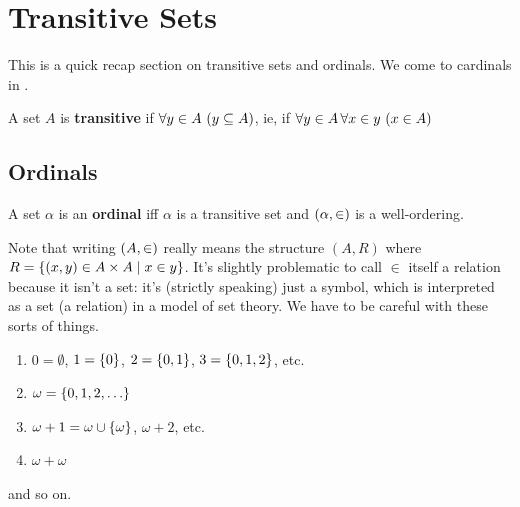 \section{Transitive Sets}

This is a quick recap section on transitive sets and ordinals. We come to cardinals in .

\begin{boxdefinition}[Transitive Set]
    A set $A$ is \textbf{transitive} if $\forall y \in A \, \left( y \subseteq A \right)$, ie, if $\forall y \in A \, \forall x \in y \, \left( x \in A \right)$
\end{boxdefinition}

\subsection{Ordinals}

\begin{boxdefinition}[Ordinal]
    A set $\alpha$ is an \textbf{ordinal} iff $\alpha$ is a transitive set and $\left( \alpha, \in \right)$ is a well-ordering.
\end{boxdefinition}

Note that writing $\left( A, \in \right)$ really means the structure $(A, R)$ where $R = \left\{ (x, y) \in A \times A \; \middle\vert \; x \in y \right\}$. It's slightly problematic to call $\in$ itself a relation because it isn't a set: it's (strictly speaking) just a symbol, which is interpreted as a set (a relation) in a model of set theory. We have to be careful with these sorts of things.

\begin{boxexample}\hfill
    \begin{enumerate}
        \item $0 = \emptyset$, $1 = \left\{ 0 \right\}$, $2 = \left\{ 0, 1 \right\}$, $3 = \left\{ 0, 1, 2 \right\}$, etc.
        \item $\omega = \left\{ 0, 1, 2, \ldots \right\}$
        \item $\omega + 1 = \omega \cup \left\{ \omega \right\}$, $\omega + 2$, etc.
        \item $\omega + \omega$
    \end{enumerate}
    and so on.
\end{boxexample}

